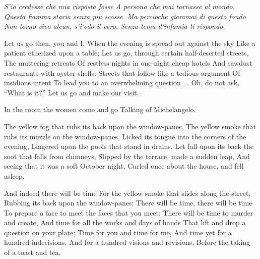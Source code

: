 \documentclass[fontsize=9, a5paper]{scrbook}
\begin{document}
\begin{poem}

	\begin{indentedverse}
		\begin{stanza}
			\verseindent\verseindent\verseindent \textit{S’io credesse che mia risposta fosse}\verseline
			\textit{A persona che mai tornasse al mondo,}\verseline
			\textit{Questa fiamma staria senza piu scosse.}\verseline
			\textit{Ma percioche giammai di questo fondo}\verseline
			\textit{Non torno vivo alcun, s’i’odo il vero,}\verseline
			\textit{Senza tema d’infamia ti rispondo.}
		\end{stanza}
	\end{indentedverse}


	\begin{stanza}
		Let us go then, you and I,\verseline
		When the evening is spread out against the sky\verseline
		Like a patient etherized upon a table;\verseline
		Let us go, through certain half-deserted streets,\verseline
		The muttering retreats\verseline
		Of restless nights in one-night cheap hotels\verseline
		And sawdust restaurants with oyster-shells:\verseline
		Streets that follow like a tedious argument\verseline
		Of insidious intent\verseline
		To lead you to an overwhelming question ...\verseline
		Oh, do not ask, “What is it?”\verseline
		Let us go and make our visit.
	\end{stanza}
	
	\begin{stanza}
		In the room the women come and go\verseline
		Talking of Michelangelo.
	\end{stanza}
	
	\begin{stanza}
		The yellow fog that rubs its back upon the window-panes,\verseline
		The yellow smoke that rubs its muzzle on the window-panes,\verseline
		Licked its tongue into the corners of the evening,\verseline
		Lingered upon the pools that stand in drains,\verseline
		Let fall upon its back the soot that falls from chimneys,\verseline
		Slipped by the terrace, made a sudden leap,\verseline
		And seeing that it was a soft October night,\verseline
		Curled once about the house, and fell asleep.
	\end{stanza}

	\pagebreak
	
	\begin{stanza}
		And indeed there will be time\verseline
		For the yellow smoke that slides along the street,\verseline
		Rubbing its back upon the window-panes;\verseline
		There will be time, there will be time\verseline
		To prepare a face to meet the faces that you meet;\verseline
		There will be time to murder and create,\verseline
		And time for all the works and days of hands\verseline
		That lift and drop a question on your plate;\verseline
		Time for you and time for me,\verseline
		And time yet for a hundred indecisions,\verseline
		And for a hundred visions and revisions,\verseline
		Before the taking of a toast and tea.
	\end{stanza}
	

\end{poem}
\end{document}

